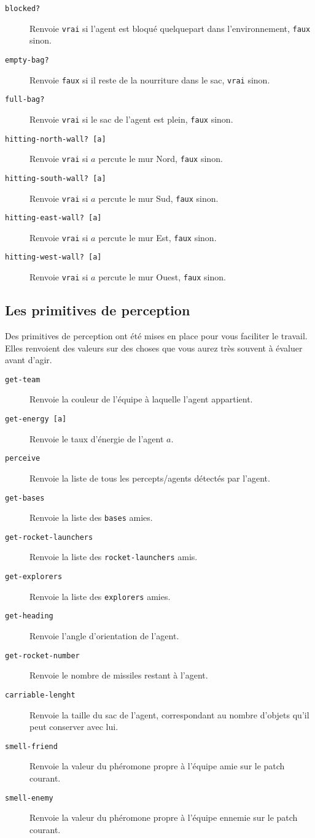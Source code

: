 \documentclass[a4paper,11pt]{article}
\begin{document}
\begin{description}
  \item[\texttt{blocked?}] Renvoie \texttt{vrai} si l'agent est bloqué quelquepart dans
    l'environnement, \texttt{faux} sinon.
  \item[\texttt{empty-bag?}] Renvoie \texttt{faux} si il reste de la nourriture dans le sac,
    \texttt{vrai} sinon.
  \item[\texttt{full-bag?}] Renvoie \texttt{vrai} si le sac de l'agent est plein, \texttt{faux}
    sinon.
  \item[\texttt{hitting-north-wall? [a]}] Renvoie \texttt{vrai} si $a$ percute le mur Nord, \texttt{faux}
    sinon.
  \item[\texttt{hitting-south-wall? [a]}] Renvoie \texttt{vrai} si $a$ percute le mur Sud, \texttt{faux}
    sinon.
  \item[\texttt{hitting-east-wall? [a]}] Renvoie \texttt{vrai} si $a$ percute le mur Est, \texttt{faux}
    sinon.
  \item[\texttt{hitting-west-wall? [a]}] Renvoie \texttt{vrai} si $a$ percute le mur Ouest, \texttt{faux}
    sinon.

\end{description}

\subsection*{Les primitives de perception}

Des primitives de perception ont été mises en place pour vous faciliter le travail. Elles renvoient
des valeurs sur des choses que vous aurez très souvent à évaluer avant d'agir.

\begin{description}
  \item[\texttt{get-team}] Renvoie la couleur de l'équipe à laquelle l'agent appartient.
  \item[\texttt{get-energy [a]}] Renvoie le taux d'énergie de l'agent $a$.
  \item[\texttt{perceive}] Renvoie la liste de tous les percepts/agents détectés par l'agent.
  \item[\texttt{get-bases}] Renvoie la liste des \texttt{bases} amies.
  \item[\texttt{get-rocket-launchers}] Renvoie la liste des \texttt{rocket-launchers} amis.
  \item[\texttt{get-explorers}] Renvoie la liste des \texttt{explorers} amies.
  \item[\texttt{get-heading}] Renvoie l'angle d'orientation de l'agent.
  \item[\texttt{get-rocket-number}] Renvoie le nombre de missiles restant à l'agent.
  \item[\texttt{carriable-lenght}] Renvoie la taille du sac de l'agent, correspondant au nombre
    d'objets qu'il peut conserver avec lui.
  \item[\texttt{smell-friend}] Renvoie la valeur du phéromone propre à l'équipe amie sur le patch
    courant.
  \item[\texttt{smell-enemy}] Renvoie la valeur du phéromone propre à l'équipe ennemie sur le patch
    courant.
\end{description}
\end{document}
